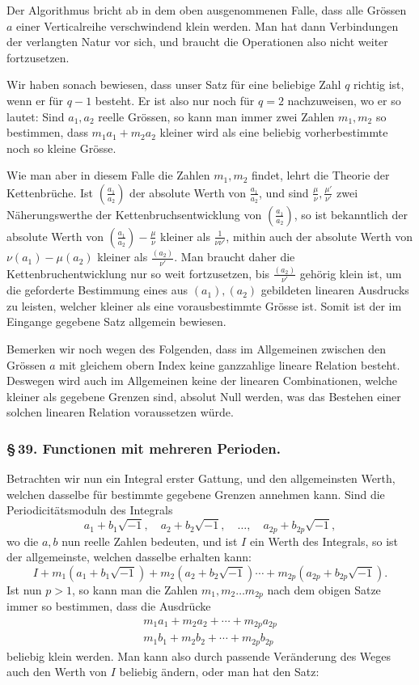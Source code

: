 \documentclass[10pt]{article}
\begin{document}
Der Algorithmus bricht ab in dem oben ausgenommenen Falle, dass alle Grössen \(a\) einer Verticalreihe verschwindend klein werden. Man hat dann Verbindungen der verlangten Natur vor sich, und braucht die Operationen also nicht weiter fortzusetzen.

Wir haben sonach bewiesen, dass unser Satz für eine beliebige Zahl \(q\) richtig ist, wenn er für \(q-1\) besteht. Er ist also nur noch für \(q=2\) nachzuweisen, wo er so lautet: Sind \(a_1,a_2\) reelle Grössen, so kann man immer zwei Zahlen \(m_1,m_2\) so bestimmen, dass \(m_1a_1+m_2a_2\) kleiner wird als eine beliebig vorherbestimmte noch so kleine Grösse.

Wie man aber in diesem Falle die Zahlen \(m_1,m_2\) findet, lehrt die Theorie der Kettenbrüche. Ist \(\left(\frac{a_1}{a_2}\right)\) der absolute Werth von \(\frac{a_1}{a_2}\), und sind \(\frac{\mu}{\nu},\frac{\mu'}{\nu'}\) zwei Näherungswerthe der Kettenbruchsentwicklung von \(\left(\frac{a_1}{a_2}\right)\), so ist bekanntlich der absolute Werth von \(\left(\frac{a_1}{a_2}\right)-\frac{\mu}{\nu}\) kleiner als \(\frac{1}{\nu\nu'}\), mithin auch der absolute Werth von \(\nu(a_1)-\mu(a_2)\) kleiner als \(\frac{(a_2)}{\nu'}\). Man braucht daher die Kettenbruchentwicklung nur so weit fortzusetzen, bis \(\frac{(a_2)}{\nu'}\) gehörig klein ist, um die geforderte Bestimmung eines aus \((a_1),(a_2)\) gebildeten linearen Ausdrucks zu leisten, welcher kleiner als eine vorausbestimmte Grösse ist. Somit ist der im Eingange gegebene Satz allgemein bewiesen.

Bemerken wir noch wegen des Folgenden, dass im Allgemeinen zwischen den Grössen \(a\) mit gleichem obern Index keine ganzzahlige lineare Relation besteht. Deswegen wird auch im Allgemeinen keine der linearen Combinationen, welche kleiner als gegebene Grenzen sind, absolut Null werden, was das Bestehen einer solchen linearen Relation voraussetzen würde.

\subsubsection*{\S\,39. Functionen mit mehreren Perioden.}

Betrachten wir nun ein Integral erster Gattung, und den allgemeinsten Werth, welchen dasselbe für bestimmte gegebene Grenzen annehmen kann. Sind die Periodicitätsmoduln des Integrals
\[
a_1+b_1\sqrt{-1},\quad a_2+b_2\sqrt{-1},\quad\ldots,\quad a_{2p}+b_{2p}\sqrt{-1},
\]
wo die \(a,b\) nun reelle Zahlen bedeuten, und ist \(I\) ein Werth des Integrals, so ist der allgemeinste, welchen dasselbe erhalten kann:
\[
I+m_1(a_1+b_1\sqrt{-1})+m_2(a_2+b_2\sqrt{-1})\cdots+m_{2p}(a_{2p}+b_{2p}\sqrt{-1}).
\]
Ist nun \(p>1\), so kann man die Zahlen \(m_1,m_2\ldots m_{2p}\) nach dem obigen Satze immer so bestimmen, dass die Ausdrücke
\[
\begin{array}{c}
m_1a_1+m_2a_2+\cdots+m_{2p}a_{2p}\\
m_1b_1+m_2b_2+\cdots+m_{2p}b_{2p}
\end{array}
\]
beliebig klein werden. Man kann also durch passende Veränderung des Weges auch den Werth von \(I\) beliebig ändern, oder man hat den Satz:
\end{document}
